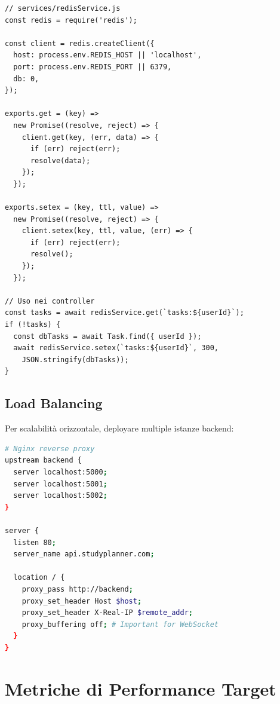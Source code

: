 \documentclass[12pt,a4paper]{report}
\begin{document}
\begin{lstlisting}
// services/redisService.js
const redis = require('redis');

const client = redis.createClient({
  host: process.env.REDIS_HOST || 'localhost',
  port: process.env.REDIS_PORT || 6379,
  db: 0,
});

exports.get = (key) => 
  new Promise((resolve, reject) => {
    client.get(key, (err, data) => {
      if (err) reject(err);
      resolve(data);
    });
  });

exports.setex = (key, ttl, value) => 
  new Promise((resolve, reject) => {
    client.setex(key, ttl, value, (err) => {
      if (err) reject(err);
      resolve();
    });
  });

// Uso nei controller
const tasks = await redisService.get(`tasks:${userId}`);
if (!tasks) {
  const dbTasks = await Task.find({ userId });
  await redisService.setex(`tasks:${userId}`, 300, 
    JSON.stringify(dbTasks));
}
\end{lstlisting}

\subsection{Load Balancing}

Per scalabilità orizzontale, deployare multiple istanze backend:

\begin{lstlisting}[language=bash]
# Nginx reverse proxy
upstream backend {
  server localhost:5000;
  server localhost:5001;
  server localhost:5002;
}

server {
  listen 80;
  server_name api.studyplanner.com;
  
  location / {
    proxy_pass http://backend;
    proxy_set_header Host $host;
    proxy_set_header X-Real-IP $remote_addr;
    proxy_buffering off; # Important for WebSocket
  }
}
\end{lstlisting}

\section{Metriche di Performance Target}
\end{document}
